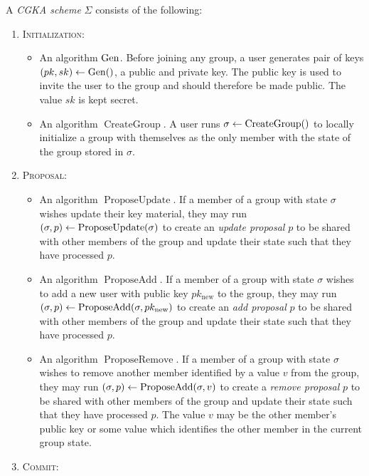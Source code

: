 \begin{definition}[CGKA]
	A \emph{CGKA scheme} $\Sigma$ consists of the following:
	\begin{enumerate}[1.]
		\item[] \textsc{Initialization:}
			\begin{itemize}
				\item An algorithm $\mathrm{Gen}$. Before joining any group, a user generates pair of keys $(pk, sk) \leftarrow \mathrm{Gen}()$, a public and private key. The public key is used to invite the user to the group and should therefore be made public. The value $sk$ is kept secret.
				\item An algorithm $\operatorname{CreateGroup}$. A user runs $\sigma \leftarrow \operatorname{CreateGroup}()$ to locally initialize a group with themselves as the only member with the state of the group stored in $\sigma$.
			\end{itemize}
		\item[] \textsc{Proposal:}
			\begin{itemize}
				\item An algorithm $\operatorname{ProposeUpdate}$. If a member of a group with state $\sigma$ wishes update their key material, they may run $(\sigma, p) \leftarrow \operatorname{ProposeUpdate}(\sigma)$ to create an \emph{update proposal} $p$ to be shared with other members of the group and update their state such that they have processed $p$.
				\item An algorithm $\operatorname{ProposeAdd}$. If a member of a group with state $\sigma$ wishes to add a new user with public key $pk_{\mathrm{new}}$ to the group, they may run $(\sigma, p) \leftarrow \operatorname{ProposeAdd}(\sigma, pk_{\mathrm{new}})$ to create an \emph{add proposal} $p$ to be shared with other members of the group and update their state such that they have processed $p$.
				\item An algorithm $\operatorname{ProposeRemove}$. If a member of a group with state $\sigma$ wishes to remove another member identified by a value $v$ from the group, they may run $(\sigma, p) \leftarrow \operatorname{ProposeAdd}(\sigma, v)$ to create a \emph{remove proposal} $p$ to be shared with other members of the group and update their state such that they have processed $p$. The value $v$ may be the other member's public key or some value which identifies the other member in the current group state.
			\end{itemize}
		\item[] \textsc{Commit:}
			\begin{itemize}

\end{itemize}
\end{enumerate}
\end{definition}
